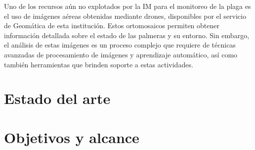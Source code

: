 Uno de los recursos aún no explotados por la IM para el monitoreo de la plaga es el uso de imágenes aéreas obtenidas mediante drones, disponibles por el servicio de Geomática de esta institución. Estos ortomosaicos  permiten obtener información detallada sobre el estado de las palmeras y su entorno. Sin embargo, el análisis de estas imágenes es un proceso complejo que requiere de técnicas avanzadas de procesamiento de imágenes y aprendizaje automático, así como también herramientas que brinden soporte a estas actividades.


\section{Estado del arte}
\label{sec:estadoArte}



\section{Objetivos y alcance}
\label{sec:objetivos}

